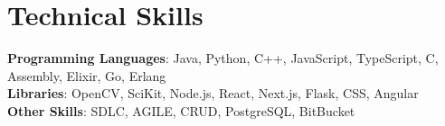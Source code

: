 \documentclass[letterpaper,11pt]{article}
\begin{document}
\section{Technical Skills}
\begin{itemize}[leftmargin=0.15in, label={}]
  \small{\item{
    \textbf{Programming Languages}{: Java, Python, C++, JavaScript, TypeScript, C, Assembly, Elixir, Go, Erlang} \\
    \textbf{Libraries}{: OpenCV, SciKit, Node.js, React, Next.js, Flask, CSS, Angular} \\
    \textbf{Other Skills}{: SDLC, AGILE, CRUD, PostgreSQL, BitBucket} \\
  }}
\end{itemize}
\end{document}
